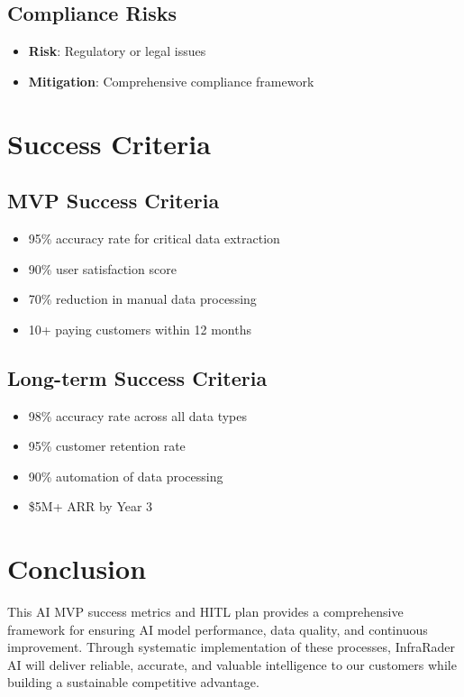 \documentclass[business]{../templates/infraradar-main}
\begin{document}
\subsection{Compliance Risks}
\begin{itemize}
    \item \textbf{Risk}: Regulatory or legal issues
    \item \textbf{Mitigation}: Comprehensive compliance framework
\end{itemize}

\section{Success Criteria}

\subsection{MVP Success Criteria}
\begin{itemize}
    \item 95\% accuracy rate for critical data extraction
    \item 90\% user satisfaction score
    \item 70\% reduction in manual data processing
    \item 10+ paying customers within 12 months
\end{itemize}

\subsection{Long-term Success Criteria}
\begin{itemize}
    \item 98\% accuracy rate across all data types
    \item 95\% customer retention rate
    \item 90\% automation of data processing
    \item \$5M+ ARR by Year 3
\end{itemize}

\section{Conclusion}

This AI MVP success metrics and HITL plan provides a comprehensive framework for ensuring AI model performance, data quality, and continuous improvement. Through systematic implementation of these processes, InfraRader AI will deliver reliable, accurate, and valuable intelligence to our customers while building a sustainable competitive advantage.
\end{document}
